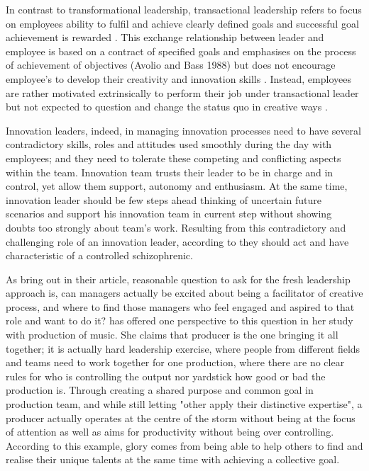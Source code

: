 In contrast to transformational leadership, transactional leadership refers to focus on employees ability to fulfil and achieve clearly defined goals \citep{hollander1978leadership,house1971path} and successful goal achievement is rewarded \citep{waldman1990adding}. This exchange relationship between leader and employee is based on a contract of specified goals and emphasises on the process of achievement of objectives (Avolio and Bass 1988) but does not encourage employee's to develop their creativity and innovation skills \citep{jung2001transformational}. Instead, employees are rather motivated extrinsically to perform their job under transactional leader but not expected to question and change the status quo in creative ways \citep{amabile1998kill}.  

Innovation leaders, indeed, in managing innovation processes need to have several contradictory skills, roles and attitudes used smoothly during the day with employees; and they need to tolerate these competing and conflicting aspects within the team. Innovation team trusts their leader to be in charge and in control, yet allow them support, autonomy and enthusiasm.  At the same time, innovation leader should be few steps ahead thinking of uncertain future scenarios and support his innovation team in current step without showing doubts too strongly about team's work. \citep{buijs2007innovation} Resulting from this contradictory and challenging role of an innovation leader, according to \citet{buijs2007innovation} they should act and have characteristic of a controlled schizophrenic. 

As \citet{garvin2008yours} bring out in their article, reasonable question to ask for the fresh leadership approach is, can managers actually be excited about being a facilitator of creative process, and where to find those managers who feel engaged and aspired to that role and want to do it? \citet{lingo2010nexus} has offered one perspective to this question in her study with production of music. She claims that producer is the one bringing it all together; it is actually hard leadership exercise, where people from different fields and teams need to work together for one production, where there are no clear rules for who is controlling the output nor yardstick how good or bad the production is. Through creating a shared purpose and common goal in production team, and while still letting "other apply their distinctive expertise", a producer actually operates at the centre of the storm without being at the focus of attention as well as aims for productivity without being over controlling. According to this example, glory comes from being able to help others to find and realise their unique talents at the same time with achieving a collective goal. \citep{lingo2010nexus}

